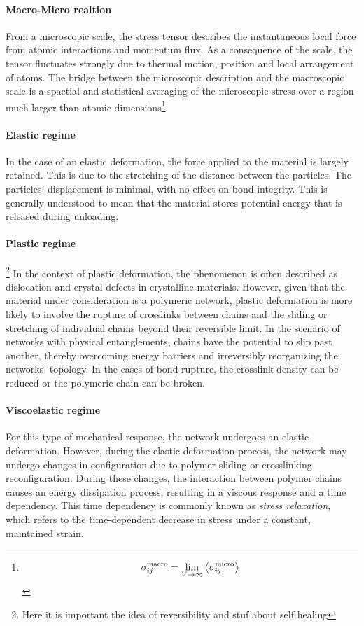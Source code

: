 \paragraph{Macro-Micro realtion} From a microscopic scale, the stress tensor describes the instantaneous local force from atomic interactions and momentum flux.
As a consequence of the scale, the tensor fluctuates strongly due to thermal motion, position and local arrangement of atoms.
The bridge between the microscopic description and the macroscopic scale is a spactial and statistical averaging of the microscopic stress over a region much larger than atomic dimensions\footnote{\[\sigma_{ij}^{\mathrm{macro}}=\lim_{V\to\infty}\expval{\sigma_{ij}^{\mathrm{micro}}}\]}.


\paragraph{Elastic regime} In the case of an elastic deformation, the force applied to the material is largely retained.
This is due to the stretching of the distance between the particles.
The particles' displacement is minimal, with no effect on bond integrity.
This is generally understood to mean that the material stores potential energy that is released during unloading.

\paragraph{Plastic regime}\footnote{Here it is important the idea of reversibility and stuf about self healing} In the context of plastic deformation, the phenomenon is often described as dislocation and crystal defects in crystalline materials.
However, given that the material under consideration is a polymeric network, plastic deformation is more likely to involve the rupture of crosslinks between chains and the sliding or stretching of individual chains beyond their reversible limit.
In the scenario of networks with physical entanglements, chains have the potential to slip past another, thereby overcoming energy barriers and irreversibly reorganizing the networks' topology.
In the cases of bond rupture, the crosslink density can be reduced or the polymeric chain can be broken.

\paragraph{Viscoelastic regime} For this type of mechanical response, the network undergoes an elastic deformation.
However, during the elastic deformation process, the network may undergo changes in configuration due to polymer sliding or crosslinking reconfiguration.
During these changes, the interaction between polymer chains causes an energy dissipation process, resulting in a viscous response and a time dependency.
This time dependency is commonly known as \textit{stress relaxation}, which refers to the time-dependent decrease in stress under a constant, maintained strain.

